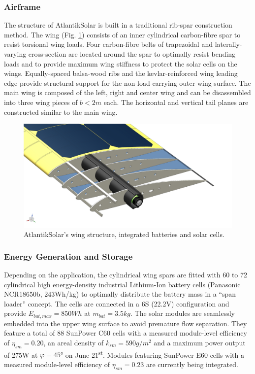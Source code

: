 \subsubsection{Airframe}
\label{secsec:Airframe and hardware}

The structure of AtlantikSolar is built in a traditional rib-spar construction method. The wing (Fig. \ref{fig:CAD_AtlantikSolarStructure}) consists of an inner cylindrical carbon-fibre spar to resist torsional wing loads. Four carbon-fibre belts of trapezoidal and laterally-varying cross-section are located around the spar to optimally resist bending loads and to provide maximum wing stiffness to protect the solar cells on the wings. Equally-spaced balsa-wood ribs and the kevlar-reinforced wing leading edge provide structural support for the non-load-carrying outer wing surface. The main wing is composed of the left, right and center wing and can be disassembled into three wing pieces of $b<2m$ each. The horizontal and vertical tail planes are constructed similar to the main wing.

\begin{figure}[tb]
    \centering
    \includegraphics[width=\linewidth]{images/7_CAD_AtlantikSolarStructure}
    \caption{AtlantikSolar's wing structure, integrated batteries and solar cells.}
    \label{fig:CAD_AtlantikSolarStructure}
\end{figure}

\subsubsection{Energy Generation and Storage}
Depending on the application, the cylindrical wing spars are fitted with 60 to 72 cylindrical high energy-density industrial Lithium-Ion battery cells (Panasonic NCR18650b, 243Wh/kg) to optimally distribute the battery mass in a ``span loader'' concept. The cells are connected in a 6S (22.2V) configuration and provide $E_{bat,max}=850Wh$ at $m_{bat}=3.5kg$. The solar modules are seamlessly embedded into the upper wing surface to avoid premature flow separation. They feature a total of 88 SunPower C60 cells with a measured module-level efficiency of $\eta_{sm}=0.20$, an areal density of $k_{sm}=590g/m^2$ and a maximum power output of 275W at $\varphi=45°$ on June 21\textsuperscript{st}. Modules featuring SunPower E60 cells with a measured \cite{Sunier_EPFLSolarModules} module-level efficiency of $\eta_{sm}=0.23$ are currently being integrated.

